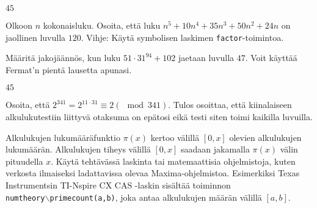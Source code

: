 \begin{kotitehtavasivu}
\begin{tehtava}
    \begin{vastaus}
        $45$
    \end{vastaus}
    
\end{tehtava}

\begin{tehtava}
    Olkoon $n$ kokonaisluku. Osoita, että luku $n^5+10n^4+35n^3+50n^2+24n$ on jaollinen luvulla $120$. Vihje: Käytä symbolisen laskimen {\tt factor}-toimintoa.
\end{tehtava}


\begin{tehtava}
    Määritä jakojäännös, kun luku $51\cdot 31^{94}+102$ jaetaan
    luvulla $47$. Voit käyttää Fermat'n pientä lausetta apunasi.
    \begin{vastaus}
    $45$
    \end{vastaus}
\end{tehtava}

\begin{tehtava}
    Osoita, että $2^{341} = 2^{11 \cdot 31} \equiv 2 (\mod 341)
    $. Tulos osoittaa, että kiinalaiseen alkulukutestiin liittyvä
    otaksuma on epätosi eikä testi siten toimi kaikilla luvuilla.
\end{tehtava}

\begin{tehtava}
    Alkulukujen lukumääräfunktio $\pi(x)$ kertoo välillä $[0, x]$
    olevien alkulukujen lukumäärän. Alkulukujen tiheys välillä $[0, x]
    $ saadaan jakamalla $\pi(x)$ välin pituudella $x$.
    Käytä tehtävässä laskinta tai matemaattisia ohjelmistoja, kuten
    verkosta ilmaiseksi ladattavissa olevaa Maxima-ohjelmistoa.
    Esimerkiksi Texas Instrumentsin TI-Nspire CX CAS -laskin sisältää
    toiminnon \\{\tt numtheory$\backslash$primecount(a,b)}, joka antaa
    alkulukujen määrän välillä $[a, b]$.
    
    \begin{vastaus}
    \end{vastaus}
\end{tehtava}


\end{kotitehtavasivu}
